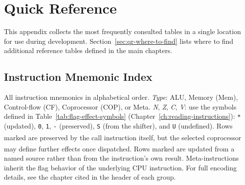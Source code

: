 \chapter{Quick Reference}
\label{appendix:quick-reference}

This appendix collects the most frequently consulted tables in a single location for use during development.
Section~\ref{sec:qr-where-to-find} lists where to find additional reference tables defined in the main chapters.

\section{Instruction Mnemonic Index}
\label{sec:qr-mnemonic-index}

All instruction mnemonics in alphabetical order. \emph{Type}: ALU, Memory (Mem), Control-flow (CF), Coprocessor (COP),
or Meta. \emph{N}, \emph{Z}, \emph{C}, \emph{V}: use the symbols defined in Table~\ref{tab:flag-effect-symbols}
(Chapter~\ref{ch:reading-instructions}): \texttt{*} (updated), \texttt{0}, \texttt{1}, \texttt{-} (preserved),
\texttt{S} (from the shifter), and \texttt{U} (undefined). Rows marked \textsuperscript{\dag} are preserved by the call
instruction itself, but the selected coprocessor may define further effects once dispatched. Rows marked
\textsuperscript{\ddag} are updated from a named source rather than from the instruction's own result.
Meta-instructions inherit the flag behavior of the underlying CPU instruction. For full encoding details, see the
chapter cited in the header of each group.

